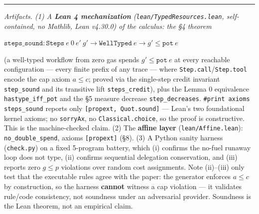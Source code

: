 \documentclass[11pt]{article}
\theoremstyle{plain}
\begin{document}
\bigskip
\noindent\rule{\linewidth}{0.4pt}
\medskip

{\itshape
\noindent Artifacts. (1) A {\bfseries Lean 4 mechanization} (\texttt{lean/TypedResources.lean},
self-contained, no Mathlib, Lean v4.30.0) of the calculus: the \S4 theorem
\begin{center}
\upshape
$\texttt{steps\_sound} : \texttt{Steps}\ e\ 0\ e'\ g' \to \texttt{WellTyped}\ e \to
g' \le \texttt{pot}\ e$
\end{center}
(a well-typed workflow from zero gas spends $g' \le \texttt{pot}\ e$ at every reachable
configuration --- every finite prefix of any trace --- where \texttt{Step.call}/\texttt{Step.tool}
encode the cap axiom $a \le c$; proved via the single-step credit invariant \texttt{step\_sound}
and its transitive lift \texttt{steps\_credit}), plus the Lemma 0 equivalence
\texttt{hastype\_iff\_pot} and the \S5 measure decrease \texttt{step\_decreases}.
\texttt{\#print axioms steps\_sound} reports only \texttt{[propext, Quot.sound]} --- Lean's two
foundational kernel axioms; no \texttt{sorryAx}, no \texttt{Classical.choice}, so the proof is
constructive. This is the machine-checked claim. (2) The {\bfseries affine layer}
(\texttt{lean/Affine.lean}): \texttt{no\_double\_spend}, axioms \texttt{[propext]} (\S8). (3) A
Python sanity harness (\texttt{check.py}) on a fixed 5-program battery, which (i) confirms the
no-fuel runaway loop does not type, (ii) confirms sequential delegation conservation, and (iii)
reports zero $g \le p$ violations over random cost assignments. Note (ii)--(iii) only test that the
executable rules agree with the paper: the generator enforces $a \le c$ by construction, so the
harness {\bfseries cannot} witness a cap violation --- it validates rule/code consistency, not
soundness under an adversarial provider. Soundness is the Lean theorem, not an empirical claim.}
\end{document}

